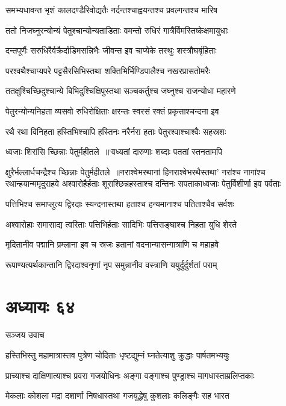 \twolineshloka
{समभ्यधावन्त भृशं कालदण्डैरिवोद्यतैः}
{नर्दन्तश्चाह्वयन्तश्च प्रवल्गन्तश्च मारिष}


\twolineshloka
{ततो निजघ्नुरन्योन्यं पेतुश्चान्योन्यताडिताः}
{वमन्तो रुधिरं गात्रैर्विमस्तिष्केक्षमायुधाः}


\twolineshloka
{दन्तपूर्णैः सरुधिरैर्वक्रैर्दाडिमसन्निभैः}
{जीवन्त इव चाप्येके तस्थुः शस्त्रौघबृंहिताः}


\twolineshloka
{परश्वथैश्चाप्यपरे पट्टसैरसिभिस्तथा}
{शक्तिभिर्भिण्डिपालैश्च नखरप्रासतोमरैः}


\twolineshloka
{ततक्षुश्चिच्छिदुश्चान्ये बिभिदुश्चिक्षिपुस्तथा}
{सञ्चकर्तुश्च जघ्नुश्च राजन्योधा महारणे}


\twolineshloka
{पेतुरन्योन्यनिहता व्यसवो रुधिरोक्षिताः}
{क्षरन्तः स्वरसं रक्तं प्रकृत्ताश्चन्दना इव}


\twolineshloka
{रथै रथा विनिहता हस्तिभिश्चापि हस्तिनः}
{नरैर्नरा हताः पेतुरश्वाश्चाश्वैः सहस्रशः}


\twolineshloka
{ध्वजाः शिरांसि च्छिन्नाः पेतुर्महीतले ॥`वध्यतां दारुणाः शब्दाः पततां स्तनतामपि}
{}


क्षुरैर्भल्लार्धचन्द्रैश्च च्छिन्नाः पेतुर्महीतले ॥नराश्वेभरथानां हिनराश्वेभरथैस्तथा'
नरांश्च नागांश्च रथान्हयान्ममृदुराहवे
\twolineshloka
{अश्वारोहैर्हताः शूराश्छिन्नहस्ताश्च दन्तिनः}
{सपताकाध्वजाः पेतुर्विशीर्णा इव पर्वताः}


\twolineshloka
{पत्तिभिश्च समाप्लुत्य द्विरदाः स्यन्दनास्तथा}
{हताश्च हन्यमानाश्च पतिताश्चैव सर्वशः}


\twolineshloka
{अश्वारोहाः समासाद्य त्वरिताः पत्तिभिर्हताः}
{सादिभिः पत्तिसङ्घाश्च निहता युधि शेरते}


\twolineshloka
{मृदितानीव पद्मानि प्रम्लाना इव च स्रजः}
{हतानां वदनान्यासन्गात्राणि च महाहवे}


\twolineshloka
{रूपाण्यत्यर्थकान्तानि द्विरदाश्वनृणां नृप}
{समुन्नानीव वस्त्राणि ययुर्दुर्दुर्शतां पराम्}


\chapter{अध्यायः ६४}
\twolineshloka
{सञ्जय उवाच}
{}


\twolineshloka
{हस्तिभिस्तु महामात्रास्तव पुत्रेण चोदिताः}
{धृष्टद्युम्नं घ्नतेत्याशु क्रुद्धाः पार्षतमभ्ययुः}


\twolineshloka
{प्राच्याश्च दाक्षिणात्याश्च प्रवरा गजयोधिनः}
{अङ्गा वङ्गाश्च पुण्ड्राश्च मागधास्ताम्रलिप्तकाः}


\twolineshloka
{मेकलाः कोशला मद्रा दशार्णा निषधास्तथा}
{गजयुद्धेषु कुशलाः कलिङ्गैः सह भारत}


